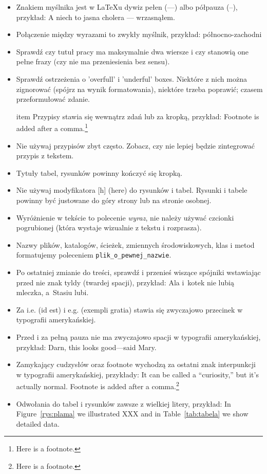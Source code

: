 \begin{itemize}
\item Znakiem myślnika jest w LaTeXu dywiz pełen (---) albo półpauza (--), przykład:
  A niech to jasna cholera --- wrzasnąłem.

\item Połączenie między wyrazami to zwykły myślnik, przykład:   północno-zachodni

\item Sprawdź czy tutuł pracy ma maksymalnie dwa wiersze i czy stanowią one pełne frazy
  (czy nie ma przeniesienia bez sensu).

\item Sprawdź ostrzeżenia o 'overfull' i 'underful' boxes. Niektóre z nich można zignorować (spójrz
  na wynik formatowania), niektóre trzeba poprawić; czasem przeformułować zdanie.

item Przypisy stawia się wewnątrz zdań lub za kropką, przykład:
  Footnote is added after a comma.\footnote{Here is a footnote.}

\item Nie używaj przypisów zbyt często. Zobacz, czy nie lepiej będzie zintegrować przypis z tekstem.

\item Tytuły tabel, rysunków powinny kończyć się kropką.

\item Nie używaj modyfikatora [h] (here) do rysunków i tabel. Rysunki i tabele powinny być
  justowane do góry strony lub na stronie osobnej.

\item Wyróżnienie w tekście to polecenie \emph{wyraz}, nie należy używać czcionki pogrubionej (która
  wystaje wizualnie z tekstu i rozprasza).

\item Nazwy plików, katalogów, ścieżek, zmiennych środowiskowych, klas i metod formatujemy poleceniem
  \texttt{plik\_o\_pewnej\_nazwie}.

\item Po ostatniej zmianie do treści, sprawdź i przenieś wiszące spójniki wstawiając przed nie znak
  tyldy (twardej spacji), przykład:
  Ala i~kotek nie lubią mleczka, a~Stasiu lubi.
  
\item Za i.e. (id est) i e.g. (exempli gratia) stawia się zwyczajowo przecinek w typografii amerykańskiej.

\item Przed i za pełną pauza nie ma zwyczajowo spacji w typografii amerykańskiej, przykład:
  Darn, this looks good---said Mary.

\item Zamykający cudzysłów oraz footnote wychodzą za ostatni znak interpunkcji w typografii 
  amerykańskiej, przykłady:
  It can be called a ``curiosity,'' but it's actually normal.
  Footnote is added after a comma.\footnote{Here is a footnote.}

\item Odwołania do tabel i rysunków zawsze z wielkiej litery, przykład:
  In Figure~\ref{rys:plama} we illustrated XXX and in Table~\ref{tab:tabela} we show detailed data.
  
\end{itemize}
